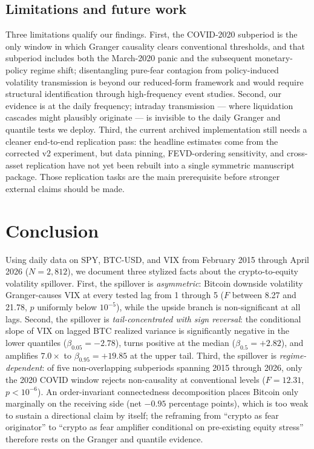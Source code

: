 \documentclass[11pt,a4paper]{article}
\begin{document}
\subsection{Limitations and future work}
\label{subsec:d_limits}

Three limitations qualify our findings. First, the COVID-2020 subperiod is the only window in which Granger causality clears conventional thresholds, and that subperiod includes both the March-2020 panic and the subsequent monetary-policy regime shift; disentangling pure-fear contagion from policy-induced volatility transmission is beyond our reduced-form framework and would require structural identification through high-frequency event studies. Second, our evidence is at the daily frequency; intraday transmission --- where liquidation cascades might plausibly originate --- is invisible to the daily Granger and quantile tests we deploy. Third, the current archived implementation still needs a cleaner end-to-end replication pass: the headline estimates come from the corrected v2 experiment, but data pinning, FEVD-ordering sensitivity, and cross-asset replication have not yet been rebuilt into a single symmetric manuscript package. Those replication tasks are the main prerequisite before stronger external claims should be made.

\section{Conclusion}
\label{sec:conclusion}

Using daily data on SPY, BTC-USD, and VIX from February 2015 through April 2026 ($N = 2{,}812$), we document three stylized facts about the crypto-to-equity volatility spillover. First, the spillover is \emph{asymmetric}: Bitcoin downside volatility Granger-causes VIX at every tested lag from 1 through 5 ($F$ between 8.27 and 21.78, $p$ uniformly below $10^{-5}$), while the upside branch is non-significant at all lags. Second, the spillover is \emph{tail-concentrated with sign reversal}: the conditional slope of VIX on lagged BTC realized variance is significantly negative in the lower quantiles ($\beta_{0.05} = -2.78$), turns positive at the median ($\beta_{0.5} = +2.82$), and amplifies $7.0\times$ to $\beta_{0.95} = +19.85$ at the upper tail. Third, the spillover is \emph{regime-dependent}: of five non-overlapping subperiods spanning 2015 through 2026, only the 2020 COVID window rejects non-causality at conventional levels ($F = 12.31$, $p < 10^{-6}$). An order-invariant connectedness decomposition places Bitcoin only marginally on the receiving side (net $-0.95$ percentage points), which is too weak to sustain a directional claim by itself; the reframing from ``crypto as fear originator'' to ``crypto as fear amplifier conditional on pre-existing equity stress'' therefore rests on the Granger and quantile evidence.
\end{document}

